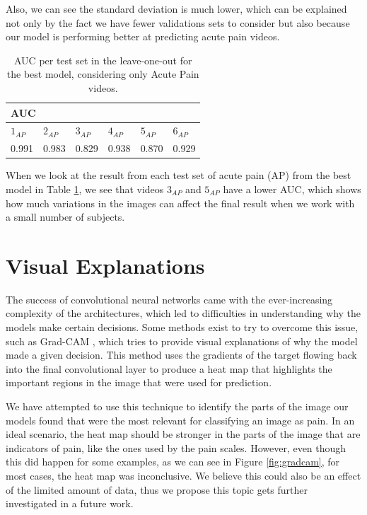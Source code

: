 Also, we can see the standard deviation is much lower, which can be explained not only by the fact we have fewer validations sets to consider but also because our model is performing better at predicting acute pain videos.

\begin{table}[h!tp]
\setlength{\tabcolsep}{3.41pt}
\centering
\caption{AUC per test set in the leave-one-out for the best model, considering only Acute Pain videos.}
\label{tab:auc_leave_one_out}
\begin{tabular}{llllll}
\hline
\multicolumn{6}{l}{AUC} \\ \hline
\multicolumn{1}{l|}{$1_{AP}$}    & \multicolumn{1}{l|}{$2_{AP}$}    & \multicolumn{1}{l|}{$3_{AP}$}    & \multicolumn{1}{l|}{$4_{AP}$}    & \multicolumn{1}{l|}{$5_{AP}$}    & $6_{AP}$   \\ \hline
\multicolumn{1}{l|}{0.991} & \multicolumn{1}{l|}{0.983} & \multicolumn{1}{l|}{0.829} & \multicolumn{1}{l|}{0.938} & \multicolumn{1}{l|}{0.870} & 0.929 \\ \hline
\end{tabular}
\end{table}

When we look at the result from each test set of acute pain (AP) from the best model in Table \ref{tab:auc_leave_one_out}, we see that videos $3_{AP}$ and $5_{AP}$ have a lower AUC, which shows how much variations in the images can affect the final result when we work with a small number of subjects.

\section{Visual Explanations}

The success of convolutional neural networks came with the ever-increasing complexity of the architectures, which led to difficulties in understanding why the models make certain decisions. Some methods exist to try to overcome this issue, such as Grad-CAM \citep{SelvarajuCDVPB17}, which tries to provide visual explanations of why the model made a given decision. This method uses the gradients of the target flowing back into the final convolutional layer to produce a heat map that highlights the important regions in the image that were used for prediction.

We have attempted to use this technique to identify the parts of the image our models found that were the most relevant for classifying an image as pain. In an ideal scenario, the heat map should be stronger in the parts of the image that are indicators of pain, like the ones used by the pain scales. However, even though this did happen for some examples, as we can see in Figure \ref{fig:gradcam}, for most cases, the heat map was inconclusive. We believe this could also be an effect of the limited amount of data, thus we propose this topic gets further investigated in a future work.

